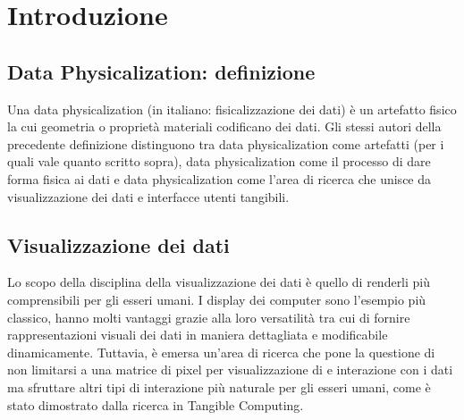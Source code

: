 \documentclass[12pt,a4paper]{report}
\begin{document}

\chapter{Introduzione}
\section{Data Physicalization: definizione}
Una data physicalization (in italiano: fisicalizzazione dei dati) è un artefatto fisico la cui geometria o proprietà materiali codificano dei dati.\cite{dataphysorg:terminology}
Gli stessi autori della precedente definizione distinguono tra data physicalization come artefatti (per i quali vale quanto scritto sopra),
data physicalization come il processo di dare forma fisica ai dati e data physicalization come l'area di ricerca che unisce da visualizzazione
dei dati e interfacce utenti tangibili.

\section{Visualizzazione dei dati}
Lo scopo della disciplina della visualizzazione dei dati è quello di renderli più comprensibili per gli esseri umani. I display dei computer
sono l'esempio più classico, hanno molti vantaggi grazie alla loro versatilità tra cui di fornire rappresentazioni visuali dei dati in
maniera dettagliata e modificabile dinamicamente. Tuttavia, è emersa un'area di ricerca che pone la questione di non limitarsi a una
matrice di pixel per visualizzazione di e interazione con i dati ma sfruttare altri tipi di interazione più naturale per gli esseri umani, come
è stato dimostrato dalla ricerca in Tangible Computing. \cite{hal:dataphys} \\
\end{document}
